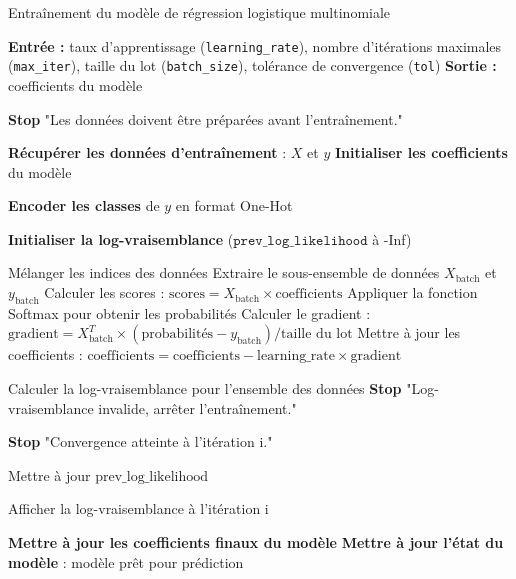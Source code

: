 \documentclass{rapport}
\begin{document}
\begin{algorithm}
\caption{Entraînement du modèle de régression logistique multinomiale}
\begin{algorithmic}[1]
\State \textbf{Entrée :} taux d'apprentissage (\texttt{learning\_rate}), nombre d'itérations maximales (\texttt{max\_iter}), taille du lot (\texttt{batch\_size}), tolérance de convergence (\texttt{tol})
\State \textbf{Sortie :} coefficients du modèle

    \State \textbf{Stop} "Les données doivent être préparées avant l'entraînement."
\EndIf

\State \textbf{Récupérer les données d'entraînement} : \( X \) et \( y \)
\State \textbf{Initialiser les coefficients} du modèle

\State \textbf{Encoder les classes} de \( y \) en format One-Hot

\State \textbf{Initialiser la log-vraisemblance} (\( \texttt{prev\_log\_likelihood} \) à -Inf)

    \State Mélanger les indices des données
        \State Extraire le sous-ensemble de données \( X_{\text{batch}} \) et \( y_{\text{batch}} \)
        \State Calculer les scores : \( \text{scores} = X_{\text{batch}} \times \text{coefficients} \)
        \State Appliquer la fonction Softmax pour obtenir les probabilités
        \State Calculer le gradient : \( \text{gradient} = X_{\text{batch}}^T \times (\text{probabilités} - y_{\text{batch}}) / \text{taille du lot} \)
        \State Mettre à jour les coefficients : \( \text{coefficients} = \text{coefficients} - \text{learning\_rate} \times \text{gradient} \)
    \EndFor
    
    \State Calculer la log-vraisemblance pour l'ensemble des données
        \State \textbf{Stop} "Log-vraisemblance invalide, arrêter l'entraînement."
    \EndIf
    
        \State \textbf{Stop} "Convergence atteinte à l'itération i."
    \EndIf
    
    \State Mettre à jour \( \text{prev\_log\_likelihood} \)
    
        \State Afficher la log-vraisemblance à l'itération i
    \EndIf
\EndFor

\State \textbf{Mettre à jour les coefficients finaux du modèle}
\State \textbf{Mettre à jour l'état du modèle} : modèle prêt pour prédiction
\end{algorithmic}
\end{algorithm}
\end{document}
